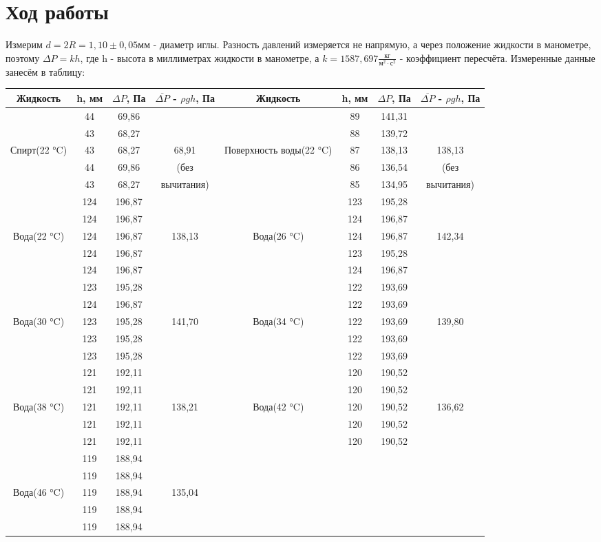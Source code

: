 \documentclass[a4paper, 12pt]{article}
\begin{document}
	\section*{Ход работы}
		Измерим $d = 2R = 1,10 \pm 0,05$мм - диаметр иглы.
		Разность давлений измеряется не напрямую, а через положение жидкости в манометре, поэтому $\Delta P = k h$, где h - высота в миллиметрах жидкости в манометре, а $k = 1587,697 \frac{кг}{м^2 \cdot с^2}$ - коэффициент пересчёта. Измеренные данные занесём в таблицу:
		\begin{longtable}[H]{|c|c|c|c||c|c|c|c|}
			\hline
			Жидкость & h, мм & $\Delta P$, Па & $\overline{\Delta P}$ - $\rho gh$, Па & Жидкость & h, мм & $\Delta P$, Па & $\overline{\Delta P}$ - $\rho gh$, Па \\
			\hline
			& 44 & 69,86 & &  & 89 & 141,31 & \\
			& 43 & 68,27 & &  & 88 & 139,72 & \\
			Спирт(22 °C) & 43 & 68,27 & 68,91 & Поверхность воды(22 °C) & 87 & 138,13 & 138,13 \\
			& 44 & 69,86 & (без &  & 86 & 136,54 & (без  \\
			& 43 & 68,27 & вычитания) &  & 85 & 134,95 & вычитания) \\
			\hline
			& 124 & 196,87 & &  & 123 & 195,28 & \\
			& 124 & 196,87 & &  & 124 & 196,87 & \\
			Вода(22 °C) & 124 & 196,87 & 138,13 & Вода(26 °C) & 124 & 196,87 & 142,34\\
			& 124 & 196,87 & &  & 123 & 195,28 & \\
			& 124 & 196,87 & &  & 124 & 196,87 & \\
			\hline
			& 123 & 195,28 & &  & 122 & 193,69 & \\
			& 124 & 196,87 & &  & 122 & 193,69 & \\
			Вода(30 °C) & 123 & 195,28 & 141,70 & Вода(34 °C) & 122 & 193,69 & 139,80\\
			& 123 & 195,28 & &  & 122 & 193,69 & \\
			& 123 & 195,28 & &  & 122 & 193,69 & \\
			\hline
			& 121 & 192,11 & &  & 120 & 190,52 & \\
			& 121 & 192,11 & &  & 120 & 190,52 & \\
			Вода(38 °C) & 121 & 192,11 & 138,21 & Вода(42 °C) & 120 & 190,52 & 136,62 \\
			& 121 & 192,11 & &  & 120 & 190,52 & \\
			& 121 & 192,11 & &  & 120 & 190,52 & \\
			\hline
			& 119 & 188,94 & &  &  &  & \\
			& 119 & 188,94 & &  &  &  & \\
			Вода(46 °C) & 119 & 188,94 & 135,04 &  &  &  & \\
			& 119 & 188,94 & &  &  &  & \\
			& 119 & 188,94 & &  &  &  & \\
			\hline 
		\end{longtable}
\end{document}
